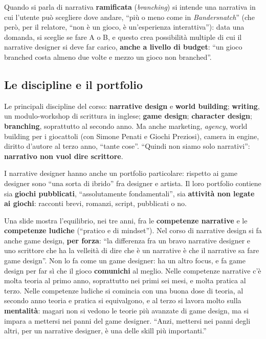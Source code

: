 Quando si parla di narrativa \textbf{ramificata} (\emph{branching}) si intende
una narrativa in cui l'utente può scegliere dove andare, ``più o meno come
in \emph{Bandersnatch}'' (che però, per il relatore, ``non è un gioco, è
un'esperienza interattiva''): data una domanda, si sceglie se fare A o B, e
questo crea possibilità multiple di cui il narrative designer si deve far
carico, \textbf{anche a livello di budget}: ``un gioco branched costa almeno
due volte e mezzo un gioco non branched''.

\subsection{Le discipline e il portfolio}

Le principali discipline del corso: \textbf{narrative design} e
\textbf{world building}; \textbf{writing}, un modulo-workshop di scrittura in
inglese; \textbf{game design}; \textbf{character design}; \textbf{branching},
soprattutto al secondo anno. Ma anche marketing, \emph{agency}, world
building per i giocattoli (con Simone Penati e Giochi Preziosi), camera in
engine, diritto d'autore al terzo anno, ``tante cose''. ``Quindi non siamo
solo narrativi'': \textbf{narrativo non vuol dire scrittore}.

I narrative designer hanno anche un portfolio particolare: rispetto ai game
designer sono ``una sorta di ibrido'' fra designer e artista. Il loro
portfolio contiene sia \textbf{giochi pubblicati}, ``assolutamente
fondamentali'', sia \textbf{attività non legate ai giochi}: racconti brevi,
romanzi, script, pubblicati o no.

Una slide mostra l'equilibrio, nei tre anni, fra le \textbf{competenze
narrative} e le \textbf{competenze ludiche} (``pratico e di mindset''). Nel
corso di narrative design si fa anche game design, \textbf{per forza}: ``la
differenza fra un bravo narrative designer e uno scrittore che ha la
velleità di dire che è un narrative è che il narrative sa fare game
design''. Non lo fa come un game designer: ha un altro focus, e fa game
design per far sì che il gioco \textbf{comunichi} al meglio. Nelle
competenze narrative c'è molta teoria al primo anno, soprattutto nei primi
sei mesi, e molta pratica al terzo. Nelle competenze ludiche si comincia con
una buona dose di teoria, al secondo anno teoria e pratica si equivalgono, e
al terzo si lavora molto sulla \textbf{mentalità}: magari non si vedono le
teorie più avanzate di game design, ma si impara a mettersi nei panni del
game designer. ``Anzi, mettersi nei panni degli altri, per un narrative
designer, è una delle skill più importanti.''

